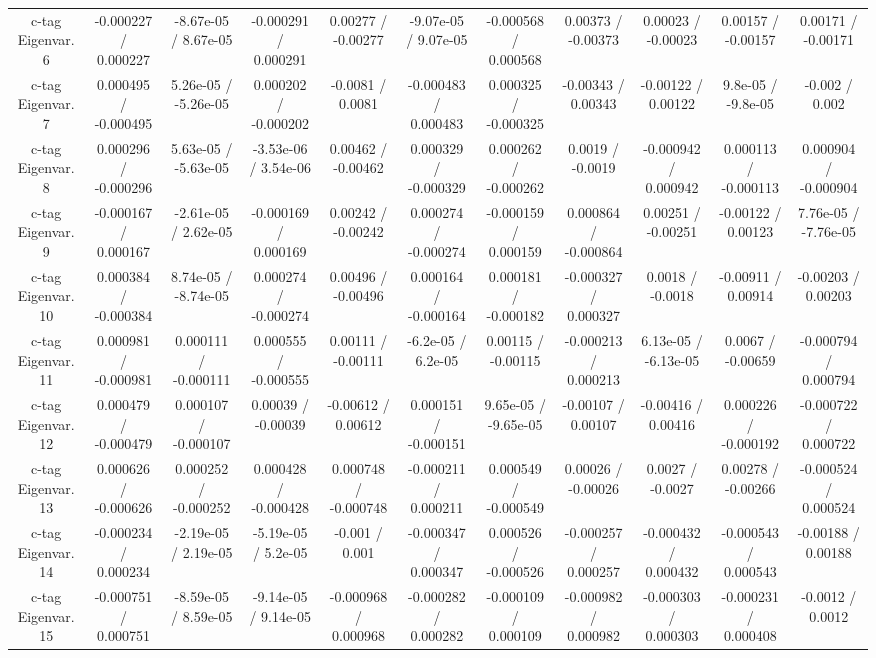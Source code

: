 {\begin{landscape}
\begin{longtable}{@{\extracolsep{\fill}}| *{11}{c|}}
  c-tag Eigenvar. 6 & -0.000227 / 0.000227 & -8.67e-05 / 8.67e-05 & -0.000291 / 0.000291 & 0.00277 / -0.00277 & -9.07e-05 / 9.07e-05 & -0.000568 / 0.000568 & 0.00373 / -0.00373 & 0.00023 / -0.00023 & 0.00157 / -0.00157 & 0.00171 / -0.00171 \\ 
  c-tag Eigenvar. 7 & 0.000495 / -0.000495 & 5.26e-05 / -5.26e-05 & 0.000202 / -0.000202 & -0.0081 / 0.0081 & -0.000483 / 0.000483 & 0.000325 / -0.000325 & -0.00343 / 0.00343 & -0.00122 / 0.00122 & 9.8e-05 / -9.8e-05 & -0.002 / 0.002 \\ 
  c-tag Eigenvar. 8 & 0.000296 / -0.000296 & 5.63e-05 / -5.63e-05 & -3.53e-06 / 3.54e-06 & 0.00462 / -0.00462 & 0.000329 / -0.000329 & 0.000262 / -0.000262 & 0.0019 / -0.0019 & -0.000942 / 0.000942 & 0.000113 / -0.000113 & 0.000904 / -0.000904 \\ 
  c-tag Eigenvar. 9 & -0.000167 / 0.000167 & -2.61e-05 / 2.62e-05 & -0.000169 / 0.000169 & 0.00242 / -0.00242 & 0.000274 / -0.000274 & -0.000159 / 0.000159 & 0.000864 / -0.000864 & 0.00251 / -0.00251 & -0.00122 / 0.00123 & 7.76e-05 / -7.76e-05 \\ 
  c-tag Eigenvar. 10 & 0.000384 / -0.000384 & 8.74e-05 / -8.74e-05 & 0.000274 / -0.000274 & 0.00496 / -0.00496 & 0.000164 / -0.000164 & 0.000181 / -0.000182 & -0.000327 / 0.000327 & 0.0018 / -0.0018 & -0.00911 / 0.00914 & -0.00203 / 0.00203 \\ 
  c-tag Eigenvar. 11 & 0.000981 / -0.000981 & 0.000111 / -0.000111 & 0.000555 / -0.000555 & 0.00111 / -0.00111 & -6.2e-05 / 6.2e-05 & 0.00115 / -0.00115 & -0.000213 / 0.000213 & 6.13e-05 / -6.13e-05 & 0.0067 / -0.00659 & -0.000794 / 0.000794 \\ 
  c-tag Eigenvar. 12 & 0.000479 / -0.000479 & 0.000107 / -0.000107 & 0.00039 / -0.00039 & -0.00612 / 0.00612 & 0.000151 / -0.000151 & 9.65e-05 / -9.65e-05 & -0.00107 / 0.00107 & -0.00416 / 0.00416 & 0.000226 / -0.000192 & -0.000722 / 0.000722 \\ 
  c-tag Eigenvar. 13 & 0.000626 / -0.000626 & 0.000252 / -0.000252 & 0.000428 / -0.000428 & 0.000748 / -0.000748 & -0.000211 / 0.000211 & 0.000549 / -0.000549 & 0.00026 / -0.00026 & 0.0027 / -0.0027 & 0.00278 / -0.00266 & -0.000524 / 0.000524 \\ 
  c-tag Eigenvar. 14 & -0.000234 / 0.000234 & -2.19e-05 / 2.19e-05 & -5.19e-05 / 5.2e-05 & -0.001 / 0.001 & -0.000347 / 0.000347 & 0.000526 / -0.000526 & -0.000257 / 0.000257 & -0.000432 / 0.000432 & -0.000543 / 0.000543 & -0.00188 / 0.00188 \\ 
  c-tag Eigenvar. 15 & -0.000751 / 0.000751 & -8.59e-05 / 8.59e-05 & -9.14e-05 / 9.14e-05 & -0.000968 / 0.000968 & -0.000282 / 0.000282 & -0.000109 / 0.000109 & -0.000982 / 0.000982 & -0.000303 / 0.000303 & -0.000231 / 0.000408 & -0.0012 / 0.0012 \\ 

\end{longtable}
\end{landscape}}
